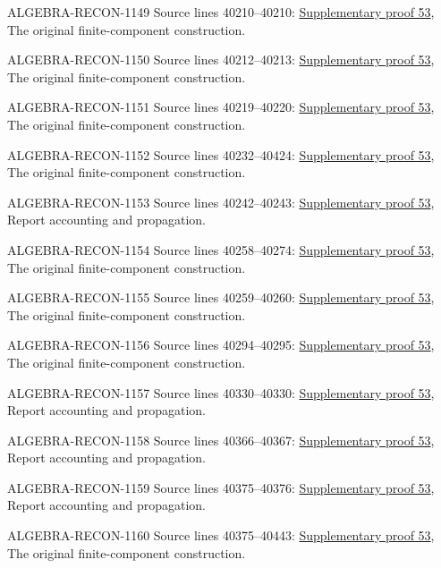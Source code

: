 \begin{AlgebraSourceRoutes}
\item[ALGEBRA-RECON-1149] Source lines 40210--40210: \hyperlink{algebra_etale_quasifinite_notes_20260928}{Supplementary proof 53}, The original finite-component construction.
\item[ALGEBRA-RECON-1150] Source lines 40212--40213: \hyperlink{algebra_etale_quasifinite_notes_20260928}{Supplementary proof 53}, The original finite-component construction.
\item[ALGEBRA-RECON-1151] Source lines 40219--40220: \hyperlink{algebra_etale_quasifinite_notes_20260928}{Supplementary proof 53}, The original finite-component construction.
\item[ALGEBRA-RECON-1152] Source lines 40232--40424: \hyperlink{algebra_etale_quasifinite_notes_20260928}{Supplementary proof 53}, The original finite-component construction.
\item[ALGEBRA-RECON-1153] Source lines 40242--40243: \hyperlink{algebra_etale_quasifinite_notes_20260928}{Supplementary proof 53}, Report accounting and propagation.
\item[ALGEBRA-RECON-1154] Source lines 40258--40274: \hyperlink{algebra_etale_quasifinite_notes_20260928}{Supplementary proof 53}, The original finite-component construction.
\item[ALGEBRA-RECON-1155] Source lines 40259--40260: \hyperlink{algebra_etale_quasifinite_notes_20260928}{Supplementary proof 53}, The original finite-component construction.
\item[ALGEBRA-RECON-1156] Source lines 40294--40295: \hyperlink{algebra_etale_quasifinite_notes_20260928}{Supplementary proof 53}, The original finite-component construction.
\item[ALGEBRA-RECON-1157] Source lines 40330--40330: \hyperlink{algebra_etale_quasifinite_notes_20260928}{Supplementary proof 53}, Report accounting and propagation.
\item[ALGEBRA-RECON-1158] Source lines 40366--40367: \hyperlink{algebra_etale_quasifinite_notes_20260928}{Supplementary proof 53}, Report accounting and propagation.
\item[ALGEBRA-RECON-1159] Source lines 40375--40376: \hyperlink{algebra_etale_quasifinite_notes_20260928}{Supplementary proof 53}, Report accounting and propagation.
\item[ALGEBRA-RECON-1160] Source lines 40375--40443: \hyperlink{algebra_etale_quasifinite_notes_20260928}{Supplementary proof 53}, The original finite-component construction.

\end{AlgebraSourceRoutes}
